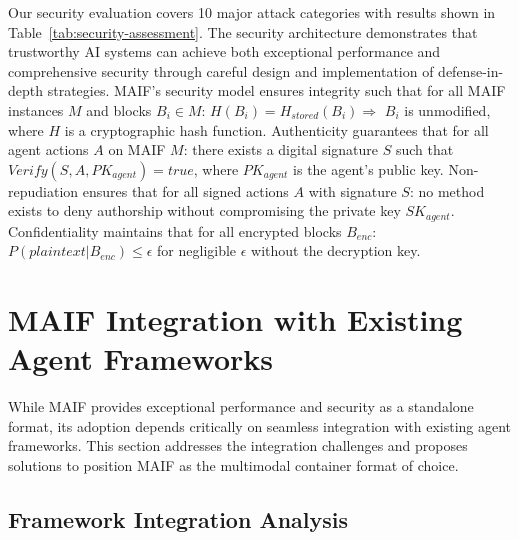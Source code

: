 \documentclass[conference]{IEEEtran}
\begin{document}
Our security evaluation covers 10 major attack categories with results shown in Table~\ref{tab:security-assessment}. The security architecture demonstrates that trustworthy AI systems can achieve both exceptional performance and comprehensive security through careful design and implementation of defense-in-depth strategies.
MAIF's security model ensures integrity such that for all MAIF instances $M$ and blocks $B_i \in M$: $H(B_i) = H_{stored}(B_i) \Rightarrow$ $B_i$ is unmodified, where $H$ is a cryptographic hash function. Authenticity guarantees that for all agent actions $A$ on MAIF $M$: there exists a digital signature $S$ such that $Verify(S, A, PK_{agent}) = true$, where $PK_{agent}$ is the agent's public key. Non-repudiation ensures that for all signed actions $A$ with signature $S$: no method exists to deny authorship without compromising the private key $SK_{agent}$. Confidentiality maintains that for all encrypted blocks $B_{enc}$: $P(plaintext | B_{enc}) \leq \epsilon$ for negligible $\epsilon$ without the decryption key.

\section{MAIF Integration with Existing Agent Frameworks}
\label{sec:integration}

While MAIF provides exceptional performance and security as a standalone format, its adoption depends critically on seamless integration with existing agent frameworks. This section addresses the integration challenges and proposes solutions to position MAIF as the multimodal container format of choice.

\subsection{Framework Integration Analysis}
\end{document}
